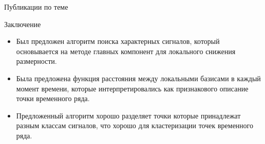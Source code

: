\documentclass{beamer}
\begin{document}
\begin{frame}{Публикации по теме}
	
\end{frame}
\begin{frame}{Заключение}
	\begin{itemize}
		\item Был предложен алгоритм поиска характерных сигналов, который основывается на методе главных компонент для локального снижения размерности.
		\item Была предложена функция расстояния между локальными базисами в каждый момент времени, которые интерпретировались как признакового описание точки временного ряда.
		\item Предложенный алгоритм хорошо разделяет точки которые принадлежат разным классам сигналов, что хорошо для кластеризации точек временного ряда.
	\end{itemize}
\end{frame}
\end{document}
